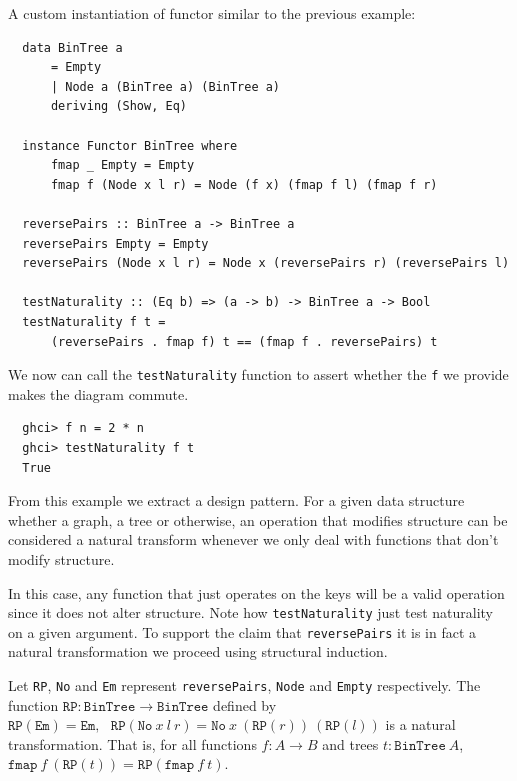 \begin{example} A custom instantiation of functor similar to the previous example:
\begin{verbatim}
  data BinTree a
      = Empty
      | Node a (BinTree a) (BinTree a)
      deriving (Show, Eq)

  instance Functor BinTree where
      fmap _ Empty = Empty
      fmap f (Node x l r) = Node (f x) (fmap f l) (fmap f r)

  reversePairs :: BinTree a -> BinTree a
  reversePairs Empty = Empty
  reversePairs (Node x l r) = Node x (reversePairs r) (reversePairs l)
  
  testNaturality :: (Eq b) => (a -> b) -> BinTree a -> Bool
  testNaturality f t =
      (reversePairs . fmap f) t == (fmap f . reversePairs) t
\end{verbatim}
We now can call the \texttt{testNaturality} function to assert whether the \texttt{f} we provide makes the diagram commute.
\begin{verbatim}
  ghci> f n = 2 * n
  ghci> testNaturality f t
  True
\end{verbatim}
\end{example}
\begin{note}
  From this example we extract a design pattern. For a given data structure whether a graph, a tree or otherwise, an operation that modifies structure can be considered a natural transform whenever we only deal with functions that don't modify structure.
\end{note}
In this case, any function that just operates on the keys will be a valid operation since it does not alter structure. Note how \texttt{testNaturality} just test naturality on a given argument. To support the claim that \texttt{reversePairs} it is in fact a natural transformation we proceed using structural induction.
\begin{theorem}
  \label{th:rpisnatural}
  Let \texttt{RP}, \texttt{No} and \texttt{Em} represent \texttt{reversePairs}, \texttt{Node} and \texttt{Empty} respectively. The function $\texttt{RP} : \texttt{BinTree} \to \texttt{BinTree}$ defined by
  \(
  \texttt{RP}(\texttt{Em}) = \texttt{Em}, \text{ } \texttt{RP}(\texttt{No}\ x\ l\ r) = \texttt{No}\ x\ (\texttt{RP}(r))\ (\texttt{RP}(l))
  \)
  is a natural transformation. That is, for all functions $f : A \to B$ and trees $t : \texttt{BinTree}\ A$,
  \(
  \texttt{fmap}\ f\ (\texttt{RP}(t)) = \texttt{RP}(\texttt{fmap}\ f\ t).
  \)
\end{theorem}

